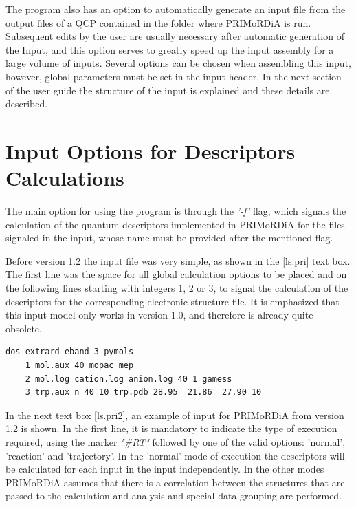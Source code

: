 \documentclass[a4paper,11pt]{refart}
\begin{document}
The program also has an option to automatically generate an input file from the output files of a QCP contained in the folder where PRIMoRDiA is run. Subsequent edits by the user are usually necessary after automatic generation of the Input, and this option serves to greatly speed up the input assembly for a large volume of inputs. Several options can be chosen when assembling this input, however, global parameters must be set in the input header. In the next section of the user guide the structure of the input is explained and these details are described.

\newpage

\section{Input Options for Descriptors Calculations}

The main option for using the program is through the \emph{'-f'} flag, which signals the calculation of the quantum descriptors implemented in PRIMoRDiA for the files signaled in the input, whose name must be provided after the mentioned flag.

Before version 1.2 the input file was very simple, as shown in the \autoref{ls.pri} text box. The first line was the space for all global calculation options to be placed and on the following lines starting with integers 1, 2 or 3, to signal the calculation of the descriptors for the corresponding electronic structure file. It is emphasized that this input model only works in version 1.0, and therefore is already quite obsolete.

\hspace*{-\leftmarginwidth}
\begin{minipage}{\fullwidth}
	\begin{lstlisting}[caption=Exemplo de input utilizado antes da versão 1.2.,label={ls.pri}]
	dos extrard eband 3 pymols
	1 mol.aux 40 mopac mep
	2 mol.log cation.log anion.log 40 1 gamess 
	3 trp.aux n 40 10 trp.pdb 28.95  21.86  27.90 10 
	\end{lstlisting}
\end{minipage}

In the next text box \autoref{ls.pri2}, an example of input for PRIMoRDiA from version 1.2 is shown. In the first line, it is mandatory to indicate the type of execution required, using the marker \emph{"\#RT"} followed by one of the valid options: 'normal', 'reaction' and 'trajectory'. In the 'normal' mode of execution the descriptors will be calculated for each input in the input independently. In the other modes PRIMoRDiA assumes that there is a correlation between the structures that are passed to the calculation and analysis and special data grouping are performed.
\end{document}
